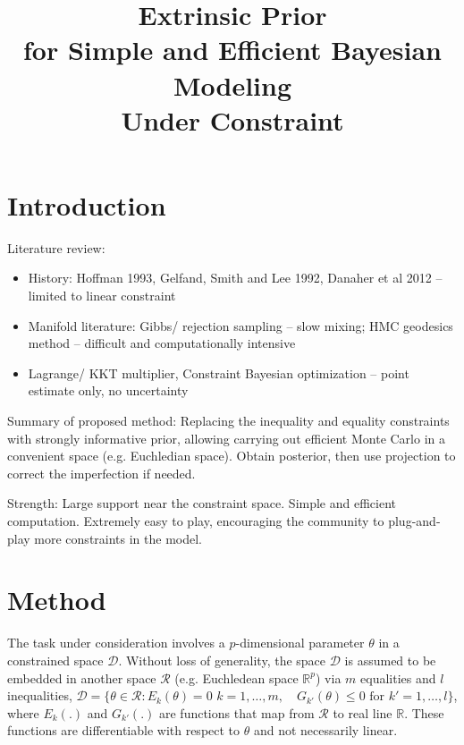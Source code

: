 \documentclass[10pt]{article}
\title{\textbf{Extrinsic Prior \\for Simple and Efficient Bayesian Modeling \\Under Constraint}}
\date{}
\newcommand{\mc}[1]{\mathcal{#1}}
\begin{document}
\maketitle

\section{Introduction}

Literature review:
\begin{itemize}
\item History: Hoffman 1993, Gelfand, Smith and Lee 1992, Danaher et al 2012 -- limited to linear constraint
\item Manifold literature: Gibbs/ rejection sampling -- slow mixing; HMC geodesics method -- difficult and computationally intensive
\item Lagrange/ KKT multiplier, Constraint Bayesian optimization -- point estimate only, no uncertainty
\end{itemize}

Summary of proposed method:
Replacing the inequality and equality constraints with strongly informative prior, allowing carrying out efficient Monte Carlo in a convenient space (e.g. Euchledian space). Obtain posterior,  then use projection to correct the imperfection if needed.

Strength: Large support near the constraint space. Simple and efficient computation. Extremely easy to play, encouraging the community to plug-and-play more constraints in the model.


\section{Method}



The task under consideration involves a $p$-dimensional parameter $\theta$ in a constrained space $\mc D$. Without loss of generality, the space $\mc D$ is assumed to be embedded in another space $\mc R$ (e.g. Euchledean space $\mathbb R^p$) via $m$ equalities and $l$ inequalities, $\mc D = \{ \theta \in \mc R: E_k(\theta)=0$  $k=1,\ldots,m, \quad G_{k'}(\theta)\le 0  \text{ for } k'=1,\ldots,l \}$, where $E_k(.)$ and $G_{k'}(.)$ are functions that map from $\mc R$ to real line $\mathbb R$. These functions are differentiable with respect to $\theta$ and not necessarily linear.
\end{document}
